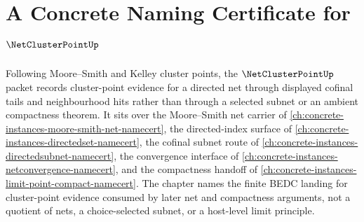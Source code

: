 \chapter{A Concrete Naming Certificate for $\NetClusterPointUp$}
\label{ch:concrete-instances-net-cluster-point-namecert}

Following Moore--Smith and Kelley cluster points, the $\NetClusterPointUp$ packet records cluster-point evidence for a directed net through displayed cofinal tails and neighbourhood hits rather than through a selected subnet or an ambient compactness theorem. It sits over the Moore--Smith net carrier of \autoref{ch:concrete-instances-moore-smith-net-namecert}, the directed-index surface of \autoref{ch:concrete-instances-directedset-namecert}, the cofinal subnet route of \autoref{ch:concrete-instances-directedsubnet-namecert}, the convergence interface of \autoref{ch:concrete-instances-netconvergence-namecert}, and the compactness handoff of \autoref{ch:concrete-instances-limit-point-compact-namecert}. The chapter names the finite BEDC landing for cluster-point evidence consumed by later net and compactness arguments, not a quotient of nets, a choice-selected subnet, or a host-level limit principle.

